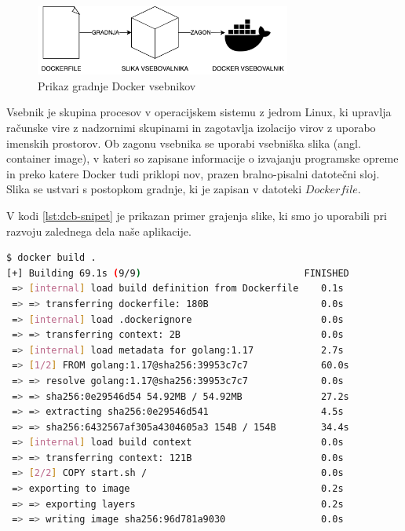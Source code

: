 \documentclass[a4paper, 12pt]{book}
\begin{document}
\begin{figure}[h]
\begin{center}
\includegraphics[width=0.75\textwidth]{slike/docker-flow.png}
\end{center}
\caption{ Prikaz gradnje Docker vsebnikov }
\label{docker-flow}
\end{figure}

Vsebnik je skupina procesov v operacijskem sistemu z jedrom Linux, ki upravlja računske vire z nadzornimi skupinami in zagotavlja izolacijo virov z uporabo imenskih prostorov. Ob zagonu vsebnika se uporabi vsebniška slika (angl. container image), v kateri so zapisane informacije o izvajanju programske opreme in preko katere Docker tudi priklopi nov, prazen bralno-pisalni datotečni sloj. Slika se ustvari s postopkom gradnje, ki je zapisan v datoteki $Dockerfile$. 

V kodi \ref{lst:dcb-snipet} je prikazan primer grajenja slike, ki smo jo uporabili pri razvoju zalednega dela naše aplikacije.
\begin{lstlisting}[language=bash, style=mystyle,caption={Grajenje slike Docker vmesnika},label=lst:dcb-snipet]
$ docker build .          
[+] Building 69.1s (9/9)                             FINISHED
 => [internal] load build definition from Dockerfile    0.1s
 => => transferring dockerfile: 180B                    0.0s
 => [internal] load .dockerignore                       0.0s
 => => transferring context: 2B                         0.0s
 => [internal] load metadata for golang:1.17            2.7s
 => [1/2] FROM golang:1.17@sha256:39953c7c7             60.0s
 => => resolve golang:1.17@sha256:39953c7c7             0.0s
 => => sha256:0e29546d54 54.92MB / 54.92MB              27.2s
 => => extracting sha256:0e29546d541                    4.5s
 => => sha256:6432567af305a4304605a3 154B / 154B        34.4s
 => [internal] load build context                       0.0s
 => => transferring context: 121B                       0.0s
 => [2/2] COPY start.sh /                               0.0s 
 => exporting to image                                  0.2s 
 => => exporting layers                                 0.2s 
 => => writing image sha256:96d781a9030                 0.0s 
\end{lstlisting}
\end{document}
